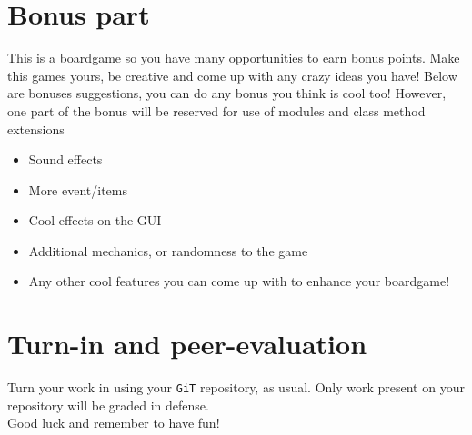 \documentclass{42-en}
\begin{document}
\chapter{Bonus part}
	
	This is a boardgame so you have many opportunities to earn bonus points.
	Make this games yours, be creative and come up with any crazy ideas you have!
	Below are bonuses suggestions, you can do any bonus you think is cool too!
	However, one part of the bonus will be reserved for use of modules and
	class method extensions

	\begin{itemize}
		\item Sound effects
		\item More event/items
		\item Cool effects on the GUI
		\item Additional mechanics, or randomness to the game
		\item Any other cool features you can come up with to enhance
		your boardgame!
	\end{itemize}



\chapter{Turn-in and peer-evaluation}

    Turn your work in using your \texttt{GiT} repository, as
    usual. Only work present on your repository will be graded in defense.\\

	Good luck and remember to have fun!



\end{document}
